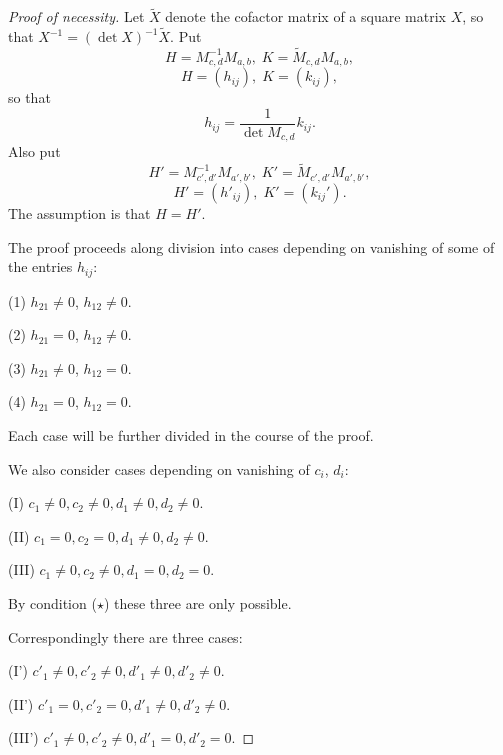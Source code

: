 \documentclass{article}
\begin{document}
\begin{proof}[Proof of necessity]
Let $\tilde X$ denote the cofactor matrix of a square matrix $X$, so that
$X^{-1}=(\det X)^{-1}\tilde X$.
Put
$$
H=M_{c,d}^{-1}M_{a,b},\;K=\tilde M_{c,d} M_{a,b},
$$
$$
H=(h_{ij}),\; K=(k_{ij}),
$$
so that
$$
h_{ij}=\frac{1}{\det M_{c,d}}k_{ij}.
$$
Also put
$$
H'= M_{c',d'}^{-1}M_{a',b'},\;
K'=\tilde M_{c',d'} M_{a',b'},
$$
$$
H'=(h'_{ij}),\;
K'=(k_{ij}').
$$
The assumption is that $H=H'$.


The proof proceeds along  division into cases
depending on vanishing of some of the entries $h_{ij}$:


(1) $h_{21}\ne 0$, $h_{12}\ne 0$.

(2) $h_{21}=0$, $h_{12}\ne 0$.

(3) $h_{21}\ne 0$, $h_{12}=0$.

(4) $h_{21}=0$, $h_{12}= 0$.

Each case will be further divided  in the course of the proof.


We also consider cases depending on  vanishing of $c_i$, $d_i$:

(I) $c_1\ne 0, c_2\ne 0, d_1\ne 0, d_2\ne 0$.

(II) $c_1=0, c_2=0, d_1\ne 0, d_2\ne 0$.

(III) $c_1\ne 0, c_2\ne 0, d_1=0, d_2=0$.

By condition ($\star$) these three are only possible.

Correspondingly there are three cases:

(I') $c'_1\ne 0, c'_2\ne 0, d'_1\ne 0, d'_2\ne 0$.

(II') $c'_1=0, c'_2=0, d'_1\ne 0, d'_2\ne 0$.

(III') $c'_1\ne 0, c'_2\ne 0,d'_1=0, d'_2=0$.



\end{proof}
\end{document}
